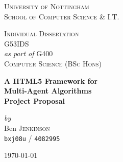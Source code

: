 \begin{titlepage}

	\begin{center}

		\vspace*{3cm}

		\textsc{\LARGE University of Nottingham}\\[0.3cm]
		\textsc{\Large School of Computer Science \& I.T.}\\

		\vspace{1cm}

		\textsc{\Large Individual Dissertation}\\[0.3cm]
		\textsc{\large G53IDS}\\[0.5cm]

		\large \emph{as part of} \textsc{G400}\\[0.3cm]
		\textsc{\Large Computer Science (\textsc{BSc Hons}) }\\[0.3cm]

		\vspace{1cm}

		{\huge \textbf{A HTML5 Framework for}}\\[0.3cm]
		{\huge \textbf{Multi-Agent Algorithms}}\\[0.6cm]
		{\huge \textbf{Project Proposal}}\\

		\vspace{1cm}

		\emph{by}\\[0.3cm]
		\Large Ben \textsc{Jenkinson}\\[0.3cm]
		\small{\texttt{bxj08u} / \texttt{4082995}}\\[0.5cm]

		\vspace{0.5cm}

		{\large \today}\\

		\vfill

	\end{center}

\end{titlepage}